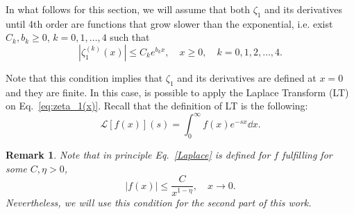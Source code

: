 \documentclass[
 aip,
 jmp,
 amsmath,amssymb,
 reprint,
 nofootinbib,
]{revtex4-2}
\begin{document}
In what follows for this section, we will assume that both $\zeta_1$ and its derivatives until 4th order are functions that grow slower than the exponential, i.e. exist $C_k, b_k\geq 0$, $k=0,1,\ldots, 4$ such that
\begin{equation}
|\zeta_1^{(k)}(x)| \le C_k e^{b_k x}, \quad x\ge 0, \quad k=0,1,2,\ldots, 4.
\end{equation}

Note that this condition implies that $\zeta_1$ and its derivatives are defined at $x = 0$ and they are finite. In this  case, is possible to apply the Laplace Transform (LT) on Eq.~\eqref{eq:zeta_1(x)}. Recall that the definition of LT is the following:
\begin{equation}\label{Laplace}
    \mathcal{L}\left[f(x)\right](s)=\int_0^\infty f(x)e^{-sx}\dd{x}.
\end{equation}
\newtheorem*{remark}{Remark}
\begin{remark}
Note that in principle Eq.~\eqref{Laplace} is defined for $f$ fulfilling for some $C,\eta>0$,
\begin{equation}\label{eq:condition-LT}
|f(x)| \leq \frac{C}{x^{1-\eta}}, \quad x\to 0.
\end{equation}
Nevertheless, we will use this condition for the second part of this work.
\end{remark}
\end{document}
